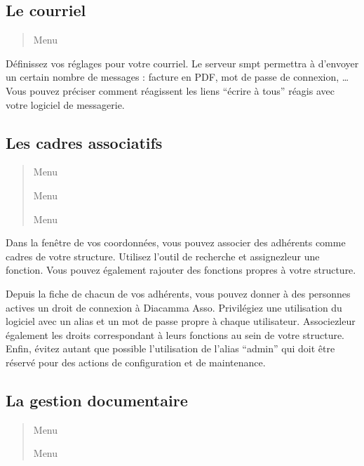 \documentclass[a4paper,10pt,oneside,french]{sphinxmanual}
\begin{document}
\subsection{Le courriel}
\label{\detokenize{asso/first_step:le-courriel}}\begin{quote}

Menu 
\end{quote}

Définissez vos réglages pour votre courriel.
Le serveur smpt permettra à  d’envoyer un certain nombre de messages : facture en PDF, mot de passe de connexion, …
Vous pouvez préciser comment réagissent les liens “écrire à tous” réagis avec votre logiciel de messagerie.


\subsection{Les cadres associatifs}
\label{\detokenize{asso/first_step:les-cadres-associatifs}}\begin{quote}

Menu 

Menu 

Menu 
\end{quote}

Dans la fenêtre de vos coordonnées, vous pouvez associer des adhérents comme cadres de votre structure.
Utilisez l’outil de recherche et assignez\sphinxhyphen{}leur une fonction.
Vous pouvez également rajouter des fonctions propres à votre structure.

Depuis la fiche de chacun de vos adhérents, vous pouvez donner à des personnes actives un droit de connexion à Diacamma Asso.
Privilégiez une utilisation du logiciel avec un alias et un mot de passe propre à chaque utilisateur. Associez\sphinxhyphen{}leur également les droits correspondant à leurs fonctions au sein de votre structure.
Enfin, évitez autant que possible l’utilisation de l’alias “admin” qui doit être réservé pour des actions de configuration et de maintenance.


\subsection{La gestion documentaire}
\label{\detokenize{asso/first_step:la-gestion-documentaire}}\begin{quote}

Menu 

Menu 
\end{quote}
\end{document}

